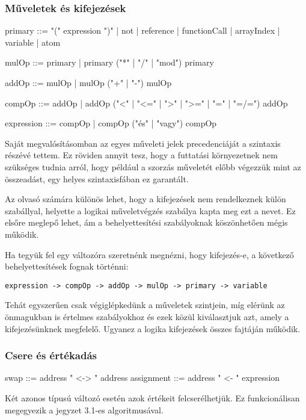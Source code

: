 \subsubsection{Műveletek és kifejezések}
\label{sec:expressions}

\begin{ebnf}
primary ::= "(" expression ")" 
    | not 
    | reference 
    | functionCall 
    | arrayIndex 
    | variable 
    | atom

mulOp ::= primary 
    | primary ("*" | "/" | "mod") primary

addOp ::= mulOp 
    | mulOp ("+" | "-") mulOp

compOp ::= addOp 
    | addOp ("<" | "<=" | ">" | ">=" | "=" | "=/=") addOp

expression ::= compOp 
    | compOp ("és" | "vagy") compOp
\end{ebnf}

Saját megvalósításomban az egyes műveleti jelek precedenciáját a szintaxis részévé tettem. Ez röviden annyit tesz, hogy a futtatási környezetnek nem szükséges tudnia arról, hogy például a szorzás műveletét előbb végezzük mint az összeadást, egy helyes szintaxisfában ez garantált.

Az olvasó számára különös lehet, hogy a kifejezések nem rendelkeznek külön szabállyal, helyette a logikai műveletvégzés szabálya kapta meg ezt a nevet. Ez elsőre meglepő lehet, ám a behelyettesítési szabályoknak köszönhetően mégis működik.

Ha tegyük fel egy változóra szeretnénk megnézni, hogy kifejezés-e, a következő behelyettesítések fognak történni:

{\small \texttt{expression -> compOp -> addOp -> mulOp -> primary -> variable}\par}

Tehát egyszerűen csak végiglépkedünk a műveletek szintjein, míg elérünk az önmagukban is értelmes szabályokhoz és ezek közül kiválasztjuk azt, amely a kifejezésünknek megfelelő. Ugyanez a logika kifejezések összes fajtáján működik.

\subsubsection{Csere és értékadás}

\begin{ebnf}
swap ::= address " <-> " address
assignment ::= address " <- " expression
\end{ebnf}

Két azonos típusú változó esetén azok értékeit felcserélhetjük. Ez funkcionálisan megegyezik a jegyzet\cite{jegyzet} 3.1-es algoritmusával.

